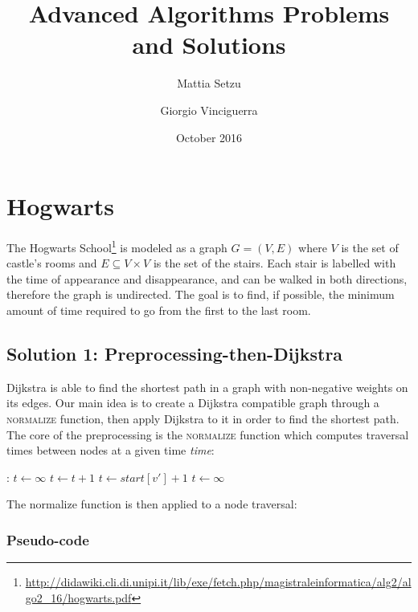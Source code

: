 \documentclass{article}
\title{Advanced Algorithms Problems and Solutions}
\author{Mattia Setzu \and Giorgio Vinciguerra}
\date{October 2016}
\begin{document}
\maketitle

\tableofcontents
\clearpage

\section{Hogwarts}

The Hogwarts School\footnote{\url{http://didawiki.cli.di.unipi.it/lib/exe/fetch.php/magistraleinformatica/alg2/algo2_16/hogwarts.pdf}}
is modeled as a graph $G=(V, E)$ where $V$ is the set of castle's rooms and $E \subseteq V \times V$
is the set of the stairs.
Each stair is labelled with the time of appearance and disappearance, and can be
walked in both directions, therefore the graph is undirected.
The goal is to find, if possible, the minimum amount of time required to go from
the first to the last room.

\subsection{Solution 1: Preprocessing-then-Dijkstra}

Dijkstra is able to find the shortest path in a graph with non-negative weights
on its edges.
Our main idea is to create a Dijkstra compatible graph through a \textsc{normalize}
function, then apply Dijkstra to it in order to find the shortest path.
The core of the preprocessing is the \textsc{normalize} function which computes traversal
times between nodes at a given time \emph{time}:

\begin{algorithmic}[1]
  :
    \State $t \gets \infty$
      
      \State $t \gets t + 1$
                
      \State $t \gets start[v'] + 1$
    \Else
      \State $t \gets \infty$          
    \EndIf
      \State {}
    \EndFunction
\end{algorithmic}

The normalize function is then applied to a node traversal:

\subsubsection{Pseudo-code}
\end{document}
